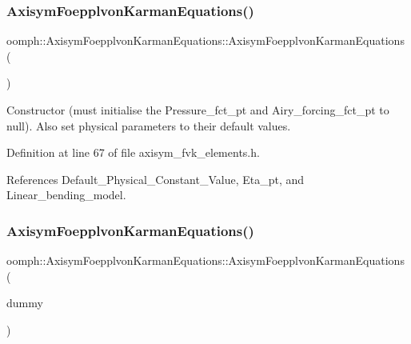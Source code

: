 \subsubsection{\texorpdfstring{Axisym\+Foepplvon\+Karman\+Equations()}{AxisymFoepplvonKarmanEquations()}\hspace{0.1cm}{\footnotesize\ttfamily [3/4]}}
{\footnotesize\ttfamily oomph\+::\+Axisym\+Foepplvon\+Karman\+Equations\+::\+Axisym\+Foepplvon\+Karman\+Equations (\begin{DoxyParamCaption}{ }\end{DoxyParamCaption})\hspace{0.3cm}{\ttfamily [inline]}}



Constructor (must initialise the Pressure\+\_\+fct\+\_\+pt and Airy\+\_\+forcing\+\_\+fct\+\_\+pt to null). Also set physical parameters to their default values. 



Definition at line 67 of file axisym\+\_\+fvk\+\_\+elements.\+h.



References Default\+\_\+\+Physical\+\_\+\+Constant\+\_\+\+Value, Eta\+\_\+pt, and Linear\+\_\+bending\+\_\+model.

\mbox{\label{classoomph_1_1AxisymFoepplvonKarmanEquations_acd3d7267a7be9c94ff44fad533806e57}} 
\subsubsection{\texorpdfstring{Axisym\+Foepplvon\+Karman\+Equations()}{AxisymFoepplvonKarmanEquations()}\hspace{0.1cm}{\footnotesize\ttfamily [4/4]}}
{\footnotesize\ttfamily oomph\+::\+Axisym\+Foepplvon\+Karman\+Equations\+::\+Axisym\+Foepplvon\+Karman\+Equations (\begin{DoxyParamCaption}\item[{const \hyperlink{classoomph_1_1AxisymFoepplvonKarmanEquations}{Axisym\+Foepplvon\+Karman\+Equations} \&}]{dummy }\end{DoxyParamCaption})\hspace{0.3cm}{\ttfamily [inline]}}



